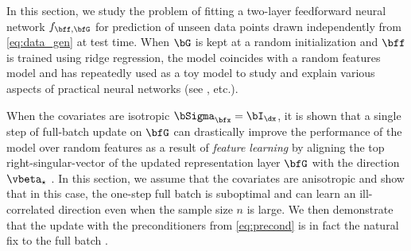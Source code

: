 In this section, we study the problem of fitting a two-layer feedforward neural network $f_{\bff, \bfG}$ for prediction of unseen data points drawn independently from \eqref{eq:data_gen} at test time. 
When $\bG$ is kept at a random initialization and $\bff$ is trained using ridge regression, the model coincides with a random features model \cite{RahimiRecht,montanari2019generalization,hu2022universality} and has repeatedly used as a toy model to study and explain various aspects of practical neural networks (see  \citet{lin2021causes,adlam2020understanding,tripuraneni2020theory,hassani2022curse,bombari23robustness,disagreement,bombari2023stability,bombari2024privacy}, etc.).

When the covariates are isotropic $\bSigma_{\bfx} = \bI_{\dx}$, it is shown that a single step of full-batch \SGD update on $\bfG$ can drastically improve the performance of the model over random features as a result of \textit{feature learning} by aligning the top right-singular-vector of the updated representation layer $\bfG$ with the direction $\vbeta_\star$ \citep{damian2022neural,ba2022high,moniri_atheory2023,cuiasymptotics,dandi2023learning,dandi2024random,dandibenefits}. In this section, we assume that the covariates are anisotropic and show that in this case, the one-step full batch \SGD is suboptimal and can learn an ill-correlated direction even when the sample size $n$ is large. We then demonstrate that the \KFAC update with the preconditioners from \eqref{eq:precond} is in fact the natural fix to the full batch \SGD. 

